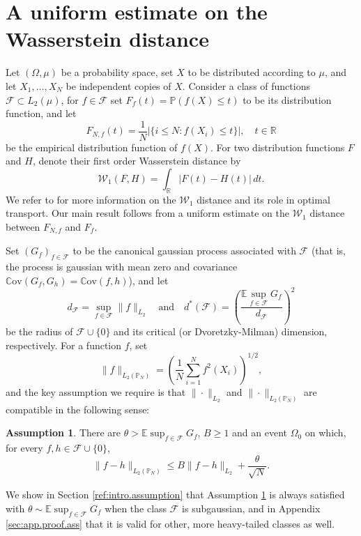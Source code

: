 \documentclass[11pt]{amsart}
\newcommand{\R}{\mathbb{R}}
\newcommand{\W}{\mathcal{W}}
\theoremstyle{definition}
\newtheorem{assumption}[theorem]{Assumption}
\newcommand{\E}{\mathbb{E}}
\renewcommand{\P}{\mathbb{P}}
\newcommand{\C}{\mathrm{\mathbb{C}ov}}
\numberwithin{equation}{section}
\begin{document}
\section{A uniform estimate on the Wasserstein distance}
\label{sec:main.general}
Let $(\Omega,\mu)$ be a probability space, set $X$ to be distributed according to $\mu$, and let $X_1,\dots,X_N$ be independent copies of $X$.
Consider a class of functions $\mathcal{F} \subset L_2(\mu)$, for $f\in\mathcal{F}$ set $F_f(t)=\P(f(X)\leq t)$ to be its distribution function, and let
\[ F_{N,f}(t) = \frac{1}{N}|\{ i \leq N : f(X_i) \leq t\}|, \quad t\in\R\]
be the empirical distribution function of $f(X)$.
For two distribution functions $F$ and $H$, denote their first order Wasserstein distance  by
\[ \W_{1}(F,H)
	=\int_\R |F(t)-H(t)|\,dt.\]
We refer  to \cite{figalli2021invitation,villani2021topics}  for more information on the $\mathcal{W}_{1}$ distance and its role in optimal transport.
Our main result follows from a uniform estimate on the $\W_1$ distance between $F_{N,f}$ and $F_f$.

Set $(G_f)_{f\in\mathcal{F}}$ to be the canonical gaussian process associated with $\mathcal{F}$ (that is, the process is gaussian with mean zero and covariance $\C(G_f,G_h) = \C(f,h)$), and let
	\[ d_{\mathcal{F}}  = \sup_{f\in\mathcal{F}} \| f\|_{L_{2}}
	\quad\text{and}\quad
	 d^{\ast} (\mathcal{F}) = \left( \frac{  \E \sup_{f\in\mathcal{F}} G_f }{ d_{\mathcal{F}} } \right)^{2} \]
be the radius of $\mathcal{F}\cup\{0\}$ and its  critical (or Dvoretzky-Milman) dimension, respectively. %
For a function $f$, set 
\[ \|f\|_{L_{2}(\P_{N})}
= \left(\frac{1}{N}\sum_{i=1}^{N} f^{2}(X_{i}) \right)^{1/2},\]
and the key assumption we require is  that $ \|\cdot \|_{L_{2}}$ and $ \|\cdot \|_{L_{2}(\P_{N})}$ are compatible in the following sense:

\begin{assumption}
\label{ass:main}
	There are  $\theta > \E \sup_{f\in\mathcal{F}} G_f $, $B\geq 1$ and an event $\Omega_{0}$ on which, for every $f,h\in\mathcal{F}\cup\{0\}$, 
	\[ \|f-h\|_{L_{2}(\P_{N})} \leq B   \|f-h\|_{L_{2}}  + \frac{\theta}{\sqrt N}.\]	
\end{assumption}


We show in Section \ref{ref:intro.assumption}  that Assumption \ref{ass:main} is always satisfied with $\theta\sim\E\sup_{f\in\mathcal{F}} G_f$ when the class $\mathcal{F}$ is subgaussian, and in Appendix \ref{sec:app.proof.ass}  that it is valid for other, more heavy-tailed classes as well.
\end{document}
